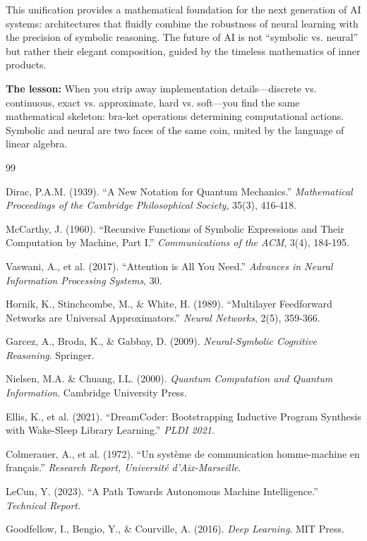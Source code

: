 \documentclass[11pt,a4paper]{article}
\theoremstyle{definition}
\begin{document}
This unification provides a mathematical foundation for the next generation of AI systems: architectures that fluidly combine the robustness of neural learning with the precision of symbolic reasoning. The future of AI is not ``symbolic vs. neural'' but rather their elegant composition, guided by the timeless mathematics of inner products.

\textbf{The lesson:} When you strip away implementation details---discrete vs. continuous, exact vs. approximate, hard vs. soft---you find the same mathematical skeleton: bra-ket operations determining computational actions. Symbolic and neural are two faces of the same coin, united by the language of linear algebra.

\begin{thebibliography}{99}

Dirac, P.A.M. (1939). ``A New Notation for Quantum Mechanics.'' \textit{Mathematical Proceedings of the Cambridge Philosophical Society}, 35(3), 416-418.

McCarthy, J. (1960). ``Recursive Functions of Symbolic Expressions and Their Computation by Machine, Part I.'' \textit{Communications of the ACM}, 3(4), 184-195.

Vaswani, A., et al. (2017). ``Attention is All You Need.'' \textit{Advances in Neural Information Processing Systems}, 30.

Hornik, K., Stinchcombe, M., \& White, H. (1989). ``Multilayer Feedforward Networks are Universal Approximators.'' \textit{Neural Networks}, 2(5), 359-366.

Garcez, A., Broda, K., \& Gabbay, D. (2009). \textit{Neural-Symbolic Cognitive Reasoning}. Springer.

Nielsen, M.A. \& Chuang, I.L. (2000). \textit{Quantum Computation and Quantum Information}. Cambridge University Press.

Ellis, K., et al. (2021). ``DreamCoder: Bootstrapping Inductive Program Synthesis with Wake-Sleep Library Learning.'' \textit{PLDI 2021}.

Colmerauer, A., et al. (1972). ``Un système de communication homme-machine en français.'' \textit{Research Report, Université d'Aix-Marseille}.

LeCun, Y. (2023). ``A Path Towards Autonomous Machine Intelligence.'' \textit{Technical Report}.

Goodfellow, I., Bengio, Y., \& Courville, A. (2016). \textit{Deep Learning}. MIT Press.

\end{thebibliography}
\end{document}
